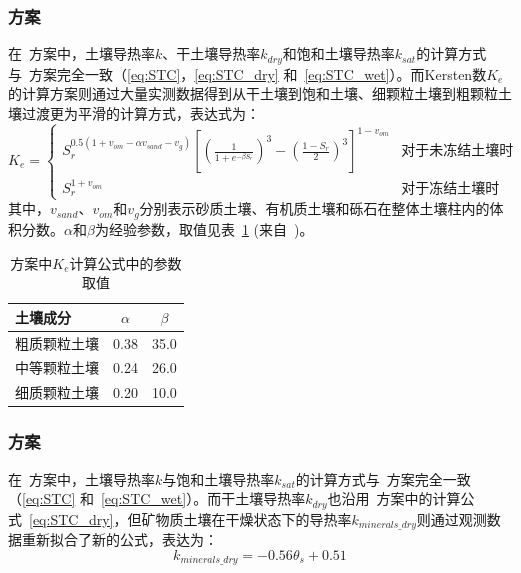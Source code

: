 \subsubsection{\citet{balland2005}方案}
在~\citet{balland2005}方案中，土壤导热率$k$、干土壤导热率$k_{dry}$和饱和土壤导热率$k_{sat}$的计算方式与~\citet{Johansen1975}方案完全一致（\eqref{eq:STC}，\eqref{eq:STC_dry} 和~\eqref{eq:STC_wet}）。而Kersten数$K_e$的计算方案则通过大量实测数据得到从干土壤到饱和土壤、细颗粒土壤到粗颗粒土壤过渡更为平滑的计算方式，表达式为：
\begin{equation}
K_e=\begin{cases}
S_r^{0.5(1+v_{om}-\alpha v_{sand}-v_g)}\left[\left(\frac{1}{1+e^{-\beta S_r}}\right)^3-\left(\frac{1-S_r}{2}\right)^3\right]^{1-v_{om}} & \text {对于未冻结土壤时} \\ 
S_r^{1+v_{om}} & \text {对于冻结土壤时}
\end{cases}
\end{equation}
其中，$v_{sand}$、$v_{om}$和$v_g$分别表示砂质土壤、有机质土壤和砾石在整体土壤柱内的体积分数。$\alpha$和$\beta$为经验参数，取值见表~\ref{tab:Balland-Arp方案中Ke计算参数取值} (来自~\citet{Barry2015thermal})。
{
\begin{table}[htbp]
    \centering
    \caption{\citet{balland2005}方案中$K_e$计算公式中的参数取值}
    \label{tab:Balland-Arp方案中Ke计算参数取值}
    \begin{tabular}{@{}lcc@{}}
    \toprule
    土壤成分               & $\alpha$     & $\beta$  \\
    \midrule
    粗质颗粒土壤                  & 0.38      & 35.0  \\
    中等颗粒土壤                  & 0.24    & 26.0   \\
    细质颗粒土壤         & 0.20   & 10.0    \\
    \bottomrule
    \end{tabular}
\end{table}
}


\subsubsection{\citet{lu2007improved}方案}
在~\citet{lu2007improved}方案中，土壤导热率$k$与饱和土壤导热率$k_{sat}$的计算方式与~\citet{Johansen1975}方案完全一致（\eqref{eq:STC} 和~\eqref{eq:STC_wet}）。而干土壤导热率$k_{dry}$也沿用~\citet{Johansen1975}方案中的计算公式~\eqref{eq:STC_dry}，但矿物质土壤在干燥状态下的导热率$k_{minerals\_dry}$则通过观测数据重新拟合了新的公式，表达为：
\begin{equation}\label{eq:STC_dry_Lu}
k_{minerals\_dry}=-0.56\theta_s+0.51
\end{equation}


